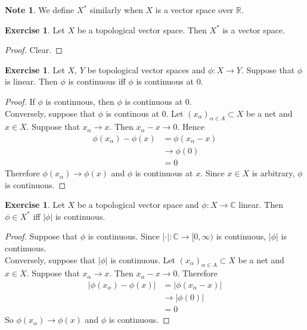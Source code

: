 \documentclass[12pt]{amsart}
\theoremstyle{definition}
\newtheorem{note}[definition]{Note}
\newtheorem{ex}[definition]{Exercise}
\newcommand{\al}{\alpha}
\newcommand{\C}{\mathbb{C}}
\newcommand{\R}{\mathbb{R}}
\newcommand{\Rg}{[0,\infty)}
\DeclareMathOperator*{\0}{\mbf{0}}
\DeclareMathOperator*{\1}{\mbf{1}}
\begin{document}
	\begin{note}
		We define $X^*$ similarly when $X$ is a vector space  over $\R$.
	\end{note}

	\begin{ex}
		Let $X$ be a topological vector space. Then $X^*$ is a vector space. 
	\end{ex}

	\begin{proof}
		Clear.
	\end{proof}

	\begin{ex}
		Let $X$, $Y$ be topological vector spaces and $\phi:X \rightarrow Y$. Suppose that $\phi$ is linear. Then $\phi$ is continuous iff $\phi$ is continuous at $0$.
	\end{ex}
	
	\begin{proof}
		If $\phi$ is continuous, then $\phi$ is continuous at $0$.\\
		Conversely, suppose that $\phi$ is continous at $0$. Let $(x_{\al})_{\al \in A} \subset X$ be a net and $x \in X$. Suppose that $x_{\al} \rightarrow x$. Then $x_{\al} - x \rightarrow 0$. Hence 
		\begin{align*}
			\phi(x_{\al}) - \phi(x) 
			&= \phi(x_{\al} - x) \\
			&\rightarrow \phi(0) \\
			&= 0
		\end{align*}
		Therefore $\phi(x_{\al}) \rightarrow \phi(x)$ and $\phi$ is continuous at $x$. Since $x \in X$ is arbitrary, $\phi$ is continuous. 
	\end{proof}

\begin{ex}
	Let $X$ be a topological vector space and $\phi :X \rightarrow \C$ linear. Then $\phi \in X^*$ iff $|\phi|$ is continuous. 
\end{ex}

\begin{proof}
	Suppose that $\phi$ is continuous. Since  $|\cdot|:\C \rightarrow \Rg$ is continuous, $|\phi|$ is continuous. \\
	Conversely, suppose that $|\phi|$ is continuous. Let $(x_{\al})_{\al \in A} \subset X$ be a net and $x \in X$. Suppose that $x_{\al} \rightarrow x$. Then $x_{\al} - x \rightarrow 0$. Therefore 
	\begin{align*}
		|\phi(x_{\al}) - \phi(x)| 
		&= |\phi(x_{\al} - x)| \\
		& \rightarrow |\phi(0)| \\
		&= 0
	\end{align*} 
	So $\phi(x_{\al}) \rightarrow \phi(x)$ and $\phi$ is continuous.
\end{proof}
\end{document}
